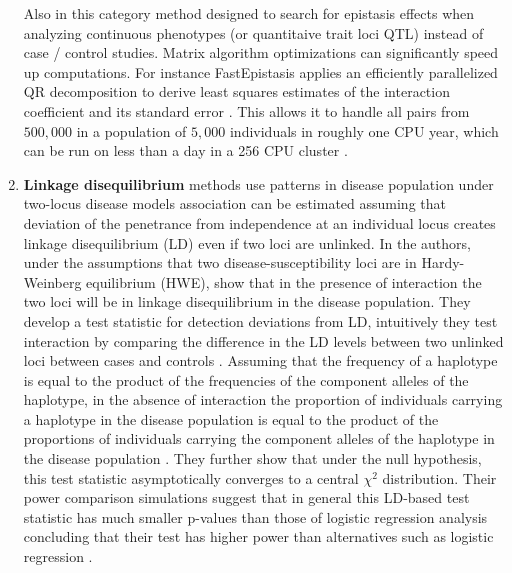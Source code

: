 \begin{enumerate}
	Also in this category method designed to search for epistasis effects when analyzing continuous phenotypes (or quantitaive trait loci QTL) instead of case / control studies.
Matrix algorithm optimizations can significantly speed up computations.
For instance FastEpistasis applies an efficiently parallelized QR decomposition to derive least squares estimates of the interaction coefficient and its standard error \cite{schupbach2010fastepistasis}.
This allows it to handle all pairs from $500,000$ in a population of $5,000$ individuals in roughly one CPU year, which can be run on less than a day in a 256 CPU cluster \cite{schupbach2010fastepistasis}.

	\item \textbf{Linkage disequilibrium} methods use patterns in disease population under two-locus disease models \cite{zhao2006test} association can be estimated assuming that deviation of the penetrance from independence at an individual locus creates linkage disequilibrium (LD) even if two loci are unlinked.  \cite{zhao2006test}
In \cite{zhao2006test} the authors, under the assumptions that two disease-susceptibility loci are in Hardy-Weinberg equilibrium (HWE), show that in the presence of interaction the two loci will be in linkage disequilibrium in the disease population.
They develop a test statistic for detection deviations from LD, intuitively they test interaction by comparing the difference in the LD levels between two unlinked loci between cases and controls \cite{zhao2006test}.
Assuming that the frequency of a haplotype is equal to the product of the frequencies of the component alleles of the haplotype, in the absence of interaction the proportion of individuals carrying a haplotype in the disease population is equal to the product of the proportions of individuals carrying the component alleles of the haplotype in the disease population \cite{zhao2006test}.
They further show that under the null hypothesis, this test statistic asymptotically converges to a central $\chi^2$ distribution.
Their power comparison simulations suggest that in general this LD-based test statistic has much smaller p-values than those of logistic regression analysis \cite{zhao2006test} concluding that their test has higher power than alternatives such as logistic regression \cite{zhao2006test}.


\end{enumerate}
